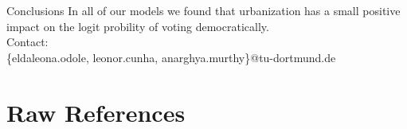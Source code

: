 \documentclass{beamer}
\begin{document}

\begin{frame}{Conclusions}
    In all of our models we found that urbanization has a small positive impact on the logit probility of voting democratically.
    \\
    Contact:\\
    \{eldaleona.odole, leonor.cunha, anarghya.murthy\}@tu-dortmund.de
    
\end{frame}

\section{Raw References}

\end{document}
